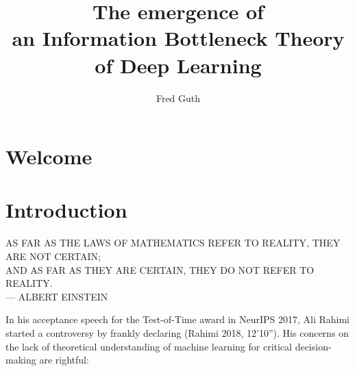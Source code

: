 \documentclass[
  letterpaper,
  12pt,
  british]{tufte-book}
\title[\[~\]]{The emergence of\\
an Information Bottleneck Theory\\
of Deep Learning\\}
\author{Fred Guth}
\renewcommand{\textls}[2][5]{%
  \begingroup\addfontfeatures{LetterSpace=#1}#2\endgroup
}
\renewcommand{\allcaps}[1]{\textls[15]{\MakeTextUppercase{#1}}}
\newcommand{\epigraph}[2]{%
  \begin{fullwidth}
  \begin{flushright}
  \sffamily\fontsize{8}{10}\selectfont
  \sffamily\footnotesize
  \begin{doublespace}
  \vspace{-8cm}\noindent\allcaps{#1}\\%
  \noindent\allcaps{#2}\\%
  \end{doublespace}
  \vspace{5.1cm}
  \end{flushright}
  \end{fullwidth}
  \normalfont
}
\renewcommand*\contentsname{Table of contents}
\newcommand\contentsname{Table of contents}
\theoremstyle{plain}
\theoremstyle{plain}
\theoremstyle{definition}
\theoremstyle{remark}
\begin{document}
\frontmatter
\maketitle
% 
% 
% 
%  

\ifdefined\Shaded\renewenvironment{Shaded}{\begin{tcolorbox}[borderline west={3pt}{0pt}{shadecolor}, interior hidden, boxrule=0pt, frame hidden, enhanced, sharp corners, breakable]}{\end{tcolorbox}}\fi

\renewcommand*\contentsname{Contents}
{
\hypersetup{linkcolor=}
\setcounter{tocdepth}{1}
\tableofcontents
}
\mainmatter
{}

\hypertarget{welcome}{%
\chapter*{Welcome}\label{welcome}}



\hypertarget{introduction}{%
\chapter{Introduction}\label{introduction}}

\epigraph{As far as the laws of mathematics refer to reality, they are not certain; \\
 and as far as they are certain, they do not refer to reality.}{--- Albert Einstein}

In his acceptance speech for the Test-of-Time award in NeurIPS
2017, Ali
Rahimi started a controversy by
frankly declaring (Rahimi 2018,
12'10'').
His concerns on the lack of theoretical understanding of machine
learning for critical decision-making are rightful:
\end{document}
